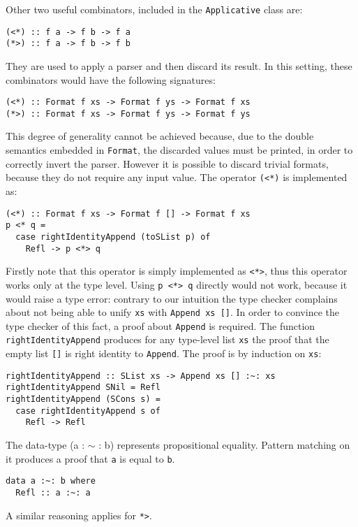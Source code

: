 \documentclass[../Thesis.tex]{subfiles}
\begin{document}
Other two useful combinators, included in the \texttt{Applicative} class are:
\begin{verbatim}
(<*) :: f a -> f b -> f a
(*>) :: f a -> f b -> f b
\end{verbatim}
They are used to apply a parser and then discard its result.
In this setting, these combinators would have the following signatures:
\begin{verbatim}
(<*) :: Format f xs -> Format f ys -> Format f xs
(*>) :: Format f xs -> Format f ys -> Format f ys
\end{verbatim}
This degree of generality cannot be achieved because, due to the double  semantics embedded in \texttt{Format}, the discarded values must be printed, in order to correctly invert the parser.
However it is possible to discard trivial formats, because they do not require any input value.
The operator \texttt{(<*)} is implemented as:
\begin{verbatim}
(<*) :: Format f xs -> Format f [] -> Format f xs
p <* q = 
  case rightIdentityAppend (toSList p) of
    Refl -> p <*> q
\end{verbatim}
Firstly note that this operator is simply implemented as \texttt{<*>}, thus
this operator works only at the type level.
Using \texttt{p <*> q} directly would not work, because it would raise a type error: contrary to our intuition the type checker complains about not being able to unify \texttt{xs} with \texttt{Append xs []}.
In order to convince the type checker of this fact, a proof about \texttt{Append} is required.
The function \texttt{rightIdentityAppend} produces for any type-level list \texttt{xs} the proof that the empty list \texttt{[]} is right identity to \texttt{Append}.
The proof is by induction on \texttt{xs}:
\begin{verbatim}
rightIdentityAppend :: SList xs -> Append xs [] :~: xs
rightIdentityAppend SNil = Refl
rightIdentityAppend (SCons s) = 
  case rightIdentityAppend s of
    Refl -> Refl
\end{verbatim}

The data-type (a : $\sim$ : b) represents propositional equality. Pattern matching on it produces a proof that \texttt{a} is equal to \texttt{b}.

\begin{verbatim}
data a :~: b where
  Refl :: a :~: a
\end{verbatim}

A similar reasoning applies for \texttt{*>}.
\end{document}
